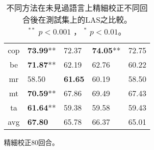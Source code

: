 \begin{table}[htbp]
\begin{subtable}[h]{0.8\textwidth}
\begin{tabular}[!ht]{c|llll}
                cop & \textbf{73.99}** & 72.37 & \textbf{74.05}** & 72.75 \\
                be & \textbf{71.87}** & 62.19 & 62.76 & 60.22 \\
                mr & 58.50 & \textbf{61.65} & 60.19 & 58.50 \\
                mt & \textbf{70.59}** & 67.86 & 69.49 & 67.43 \\
                ta & \textbf{61.64}** & 59.38 & 59.58 & 59.43 \\
                \hline
                avg & \textbf{67.80} & 65.78 & 66.37 & 65.01 \\
                \hline
            \end{tabular}
            \caption{精細校正80回合。}
        \end{subtable}
    \label{tab:delex_las_epoch_1}
    \caption{不同方法在未見過語言上精細校正不同回合後在測試集上的LAS之比較。\\
    ${ }^{**}$ $p < 0.001$ ， ${ }^{*}$ $p < 0.01$。}
\end{table}